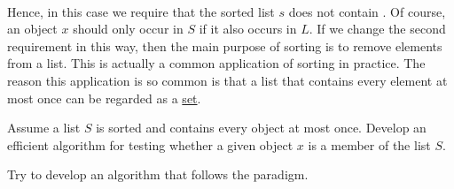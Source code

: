 \begin{enumerate}
\begin{enumerate}
        \\[0.2cm]
        Hence, in this case we require that the sorted list $s$ does not contain
        .
        Of course, an object $x$ should only occur in $S$ if it also occurs in $L$.  If we change
        the second requirement in this way, then the main purpose of sorting is to remove 
        elements from a list.  This is actually a common application of sorting in practice.  The
        reason this application is so common is that a list that contains every element at
        most once can be regarded as a \href{https://en.wikipedia.org/wiki/Set_(mathematics)}{set}.
  \end{enumerate}
\end{enumerate}

\exercise
Assume a list $S$ is sorted and contains every object at most once.  Develop an efficient
algorithm for testing whether a given object $x$ is a member of the list $S$.

\hint Try to develop an algorithm that follows the 
paradigm. 
\eoxs


